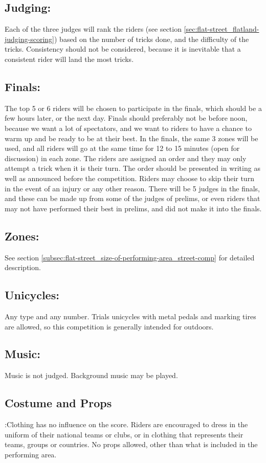 \subsection{Judging:}
Each of the three judges will rank the riders (see section \ref{sec:flat-street_flatland-judging-scoring}) based on the number of tricks done, and the difficulty of the tricks.
Consistency should not be considered, because it is inevitable that a consistent rider will land the most tricks.

\subsection{Finals:}
The top 5 or 6 riders will be chosen to participate in the finals, which should be a few hours later, or the next day.
Finals should preferably not be before noon, because we want a lot of spectators, and we want to riders to have a chance to warm up and be ready to be at their best.
In the finals, the same 3 zones will be used, and all riders will go at the same time for 12 to 15 minutes (open for discussion) in each zone.
The riders are assigned an order and they may only attempt a trick when it is their turn.
The order should be presented in writing as well as announced before the competition.
Riders may choose to skip their turn in the event of an injury or any other reason.
There will be 5 judges in the finals, and these can be made up from some of the judges of prelims, or even riders that may not have performed their best in prelims, and did not make it into the finals.

\subsection{Zones:}
See section \ref{subsec:flat-street_size-of-performing-area_street-comp} for detailed description.

\subsection{Unicycles:}
Any type and any number.
Trials unicycles with metal pedals and marking tires are allowed, so this competition is generally intended for outdoors.

\subsection{Music:}
Music is not judged.
Background music may be played.

\subsection{Costume and Props}:Clothing has no influence on the score.
Riders are encouraged to dress in the uniform of their national teams or clubs, or in clothing that represents their teams, groups or countries.
No props allowed, other than what is included in the performing area.

